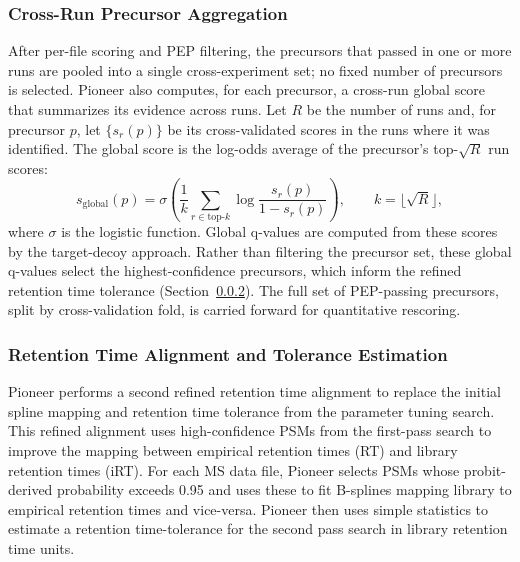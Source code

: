\documentclass[pdflatex,sn-nature]{sn-jnl}
\begin{document}
\subsubsection{Cross-Run Precursor Aggregation}\label{subsubsec:first-pass-psm-aggregation}
After per-file scoring and PEP filtering, the precursors that passed in one or more runs are pooled into a single cross-experiment set; no fixed number of precursors is selected. Pioneer also computes, for each precursor, a cross-run global score that summarizes its evidence across runs. Let $R$ be the number of runs and, for precursor $p$, let $\{s_r(p)\}$ be its cross-validated scores in the runs where it was identified. The global score is the log-odds average of the precursor's top-$\sqrt{R}$ run scores:
\begin{equation}
    s_{\text{global}}(p) = \sigma\!\left(\frac{1}{k}\sum_{r \in \text{top-}k} \log\frac{s_r(p)}{1 - s_r(p)}\right), \qquad k = \lfloor\sqrt{R}\rfloor,
\end{equation}
where $\sigma$ is the logistic function. Global q-values are computed from these scores by the target-decoy approach. Rather than filtering the precursor set, these global q-values select the highest-confidence precursors, which inform the refined retention time tolerance (Section~\ref{subsubsec:rt-alignment-tolerance-estimation}). The full set of PEP-passing precursors, split by cross-validation fold, is carried forward for quantitative rescoring.

\subsubsection{Retention Time Alignment and Tolerance Estimation}\label{subsubsec:rt-alignment-tolerance-estimation}

Pioneer performs a second refined retention time alignment to replace the initial spline mapping and retention time tolerance from the parameter tuning search. This refined alignment uses high-confidence PSMs from the first-pass search to improve the mapping between empirical retention times (RT) and library retention times (iRT). For each MS data file, Pioneer selects PSMs whose probit-derived probability exceeds 0.95 and uses these to fit B-splines mapping library to empirical retention times and vice-versa. Pioneer then uses simple statistics to estimate a retention time-tolerance for the second pass search in library retention time units. 
\end{document}
